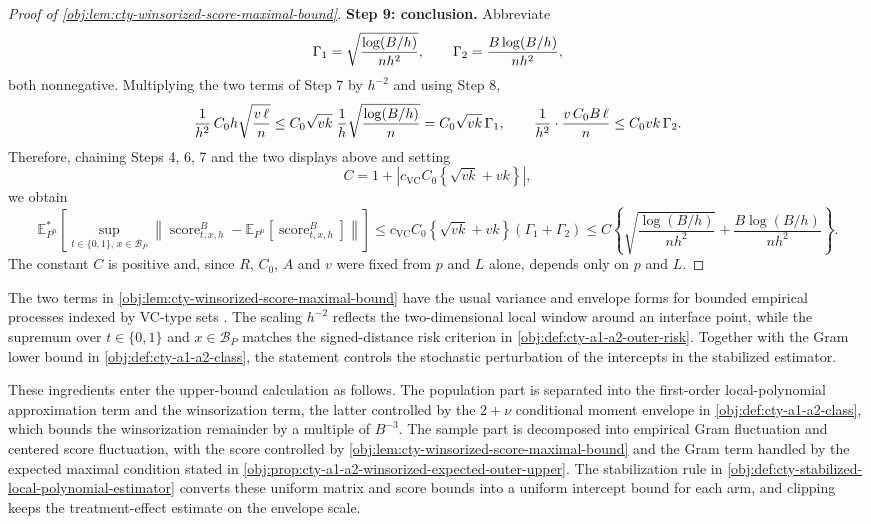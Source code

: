 \documentclass[11pt]{article}
\begin{document}
\begin{proof}[Proof of \cref{obj:lem:cty-winsorized-score-maximal-bound}]
\textbf{Step 9: conclusion.}  Abbreviate
\[
\Gamma_1=\sqrt{{\log(B/h)\over nh^{2}}},
\qquad
\Gamma_2={B\log(B/h)\over nh^{2}},
\]
both nonnegative.  Multiplying the two terms of Step 7 by \(h^{-2}\) and using Step 8,
\[
{1\over h^{2}}\,C_0h\sqrt{{v\,\ell\over n}}
\leq
C_0\sqrt{vk}\;{1\over h}\sqrt{{\log(B/h)\over n}}
=
C_0\sqrt{vk}\,\Gamma_1,
\qquad
{1\over h^{2}}\cdot{v\,C_0B\,\ell\over n}
\leq
C_0vk\,\Gamma_2 .
\]
Therefore, chaining Steps 4, 6, 7 and the two displays above and setting
\[
C=1+\left|c_{\mathrm{VC}}C_0\left\{\sqrt{vk}+vk\right\}\right|,
\]
we obtain
\[
\mathbb E_{P^n}^{*}\!\left[
\sup_{t\in\{0,1\},\,x\in\mathcal B_P}
\left\lVert
\operatorname{score}^{B}_{t,x,h}
-\mathbb E_{P^n}\!\left[\operatorname{score}^{B}_{t,x,h}\right]
\right\rVert
\right]
\leq
c_{\mathrm{VC}}C_0\left\{\sqrt{vk}+vk\right\}(\Gamma_1+\Gamma_2)
\leq
C\left\{
\sqrt{\frac{\log(B/h)}{n h^2}}
+
\frac{B\log(B/h)}{n h^2}
\right\}.
\]
The constant \(C\) is positive and, since \(R\), \(C_0\), \(A\) and \(v\) were fixed from \(p\) and \(L\) alone, depends only on \(p\) and \(L\).
\end{proof}

The two terms in \cref{obj:lem:cty-winsorized-score-maximal-bound} have the usual variance and envelope forms for bounded empirical processes indexed by VC-type sets \citep{Pollard1984,VanderVaart1996}. The scaling \(h^{-2}\) reflects the two-dimensional local window around an interface point, while the supremum over \(t\in\{0,1\}\) and \(x\in\mathcal B_P\) matches the signed-distance risk criterion in \cref{obj:def:cty-a1-a2-outer-risk}. Together with the Gram lower bound in \cref{obj:def:cty-a1-a2-class}, the statement controls the stochastic perturbation of the intercepts in the stabilized estimator.

These ingredients enter the upper-bound calculation as follows. The population part is separated into the first-order local-polynomial approximation term and the winsorization term, the latter controlled by the \(2+\nu\) conditional moment envelope in \cref{obj:def:cty-a1-a2-class}, which bounds the winsorization remainder by a multiple of \(B^{-3}\). The sample part is decomposed into empirical Gram fluctuation and centered score fluctuation, with the score controlled by \cref{obj:lem:cty-winsorized-score-maximal-bound} and the Gram term handled by the expected maximal condition stated in \cref{obj:prop:cty-a1-a2-winsorized-expected-outer-upper}. The stabilization rule in \cref{obj:def:cty-stabilized-local-polynomial-estimator} converts these uniform matrix and score bounds into a uniform intercept bound for each arm, and clipping keeps the treatment-effect estimate on the envelope scale.
\end{document}

